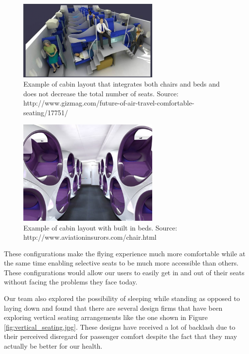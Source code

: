 \begin{figure}[h]
  \centering
     \includegraphics[width=7cm]{images/blue_vertical_configuration.png}
   \caption{Example of cabin layout that integrates both chairs and beds and does not decrease the total number of seats. Source: http://www.gizmag.com/future-of-air-travel-comfortable-seating/17751/}
  \label{fig:blue_vertical_configuration}
\end{figure} 

\begin{figure}[h]
  \centering
     \includegraphics[width=7cm]{images/purple_vertical_configuration.jpg}
   \caption{Example of cabin layout with built in beds. Source: http://www.aviationinsurors.com/chair.html}
  \label{fig:purple_vertical_configuration}
\end{figure} 

These configurations make the flying experience much more comfortable while at the same time enabling selective seats to be much more accessible than others. These configurations would allow our users to easily get in and out of their seats without facing the problems they face today.

Our team also explored the possibility of sleeping while standing as opposed to laying down and found that there are several design firms that have been exploring vertical seating arrangements like the one shown in Figure \ref{fig:vertical_seating.jpg}. These designs have received a lot of backlash due to their perceived disregard for passenger comfort despite the fact that they may actually be better for our health. 

